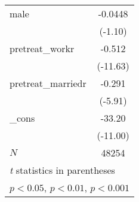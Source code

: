 {\begin{tabular}{l*{1}{c}}
male        &     -0.0448         \\
            &     (-1.10)         \\
[1em]
pretreat\_workr&      -0.512\sym{***}\\
            &    (-11.63)         \\
[1em]
pretreat\_marriedr&      -0.291\sym{***}\\
            &     (-5.91)         \\
[1em]
\_cons      &      -33.20\sym{***}\\
            &    (-11.00)         \\
\hline
\(N\)       &       48254         \\
\hline\hline
\multicolumn{2}{l}{\footnotesize \textit{t} statistics in parentheses}\\
\multicolumn{2}{l}{\footnotesize \sym{*} \(p<0.05\), \sym{**} \(p<0.01\), \sym{***} \(p<0.001\)}\\
\end{tabular}
}
